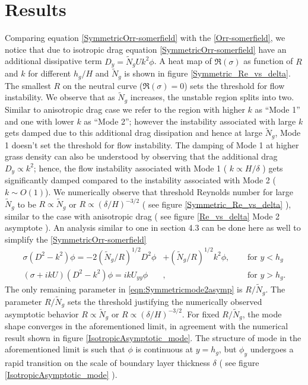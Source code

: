 \documentclass[12pt]{report}   %
\newcommand{\hg}{h_g}
\newcommand{\Rey}{{R}}
\newcommand{\Ndg}{\tilde{N}_g}
\begin{document}
\section{Results}
Comparing equation \eqref{SymmetricOrr-somerfield} with the \eqref{Orr-somerfield}, we notice that due to isotropic drag equation \eqref{SymmetricOrr-somerfield} have an additional dissipative term $ D_y = \Ndg U k^2 \phi$. %
A heat map of $\Re (\sigma)$ as function of $R$ and $k$ for different $h_g/H$ and $\Ndg$ is shown in figure \ref{Symmetric_Re_vs_delta}. The smallest $R$ on the neutral curve 
($\Re (\sigma)=0$) sets the threshold for flow instability. We observe that as $\Ndg$ increases, the unstable region splits into two. Similar to anisotropic drag case we refer to the region with higher $k$ as ``Mode 1'' and one with lower $k$ as ``Mode 2''; however the instability associated with large $k$ gets damped due to this additional drag dissipation and hence at large $\Ndg$, Mode 1 doesn't set the threshold for flow instability. The damping of Mode 1 at higher grass density can also be understood by observing that the additional drag $D_y \propto k^2$; hence, the flow instability associated with Mode 1 ( $k\propto H/\delta$ ) gets significantly damped compared to the instability associated with Mode 2 ($k\sim O(1)$). We numerically observe that threshold Reynolds number for large $\Ndg$ to be $ R \propto \Ndg$  or $R \propto (\delta/H)^{-3/2}$ ( see figure \ref{Symmetric_Re_vs_delta} ), similar to the case with anisotropic drag ( see figure \ref{Re_vs_delta} Mode 2 asymptote ). An analysis similar to one in section 4.3 can be done here as well to simplify the \ref{SymmetricOrr-somerfield}
\begin{subequations}
\begin{align}
\sigma\left( D^2-k^2\right)\phi = -2{(\Ndg/\Rey)^{1/2}}D^2\phi &+ (\Ndg/R)^{1/2} k^2 \phi,  \quad &\text{ for } y<\hg  \label{eqn:Symmetricmode2asympa} \\
\left(\sigma+ikU\right) \left(D^2-k^2\right)\phi =  ikU_{yy}\phi &, \quad &\text{ for } y>\hg. \label{eqn:Symmetricmode2asympb}
\end{align}
\label{eqn:Symmetricmode2asymp}
\end{subequations}
The only remaining parameter in \eqref{eqn:Symmetricmode2asymp} is $\Rey/\Ndg$. The parameter $\Rey/\Ndg$ sets the threshold justifying the numerically observed asymptotic behavior $\Rey \propto \Ndg $ or $ \Rey \propto (\delta/H)^{-3/2}$. For fixed $\Rey/\Ndg$, the mode shape converges in the aforementioned limit, in agreement with the numerical result shown in figure \ref{IsotropicAsymptotic_mode}. The structure of mode in the aforementioned limit is such that $\phi$ is continuous at $y=h_g$, but $\phi_y$ undergoes a rapid transition on the scale of boundary layer thickness $\delta$ 
( see figure \ref{IsotropicAsymptotic_mode} ).
\end{document}

